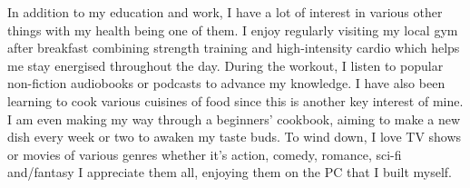 

\begin{cvparagraph}

In addition to my education and work, I have a lot of interest in various other things with my health being one of them. I enjoy regularly visiting my local gym after breakfast combining strength training and high-intensity cardio which helps me stay energised throughout the day. During the workout, I listen to popular non-fiction audiobooks or podcasts to advance my knowledge. I have also been learning to cook various cuisines of food since this is another key interest of mine. I am even making my way through a beginners’ cookbook, aiming to make a new dish every week or two to awaken my taste buds. To wind down, I love TV shows or movies of various genres whether it’s action, comedy, romance, sci-fi and/fantasy I appreciate them all, enjoying them on the PC that I built myself.
\end{cvparagraph}